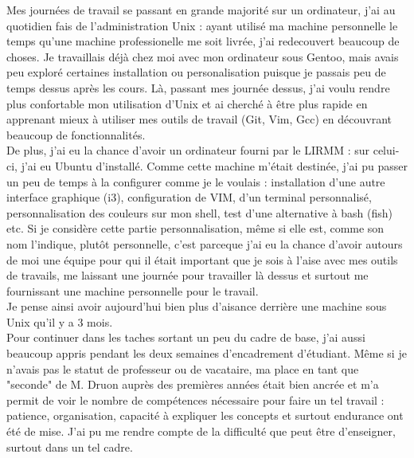 \documentclass[11pt,french,a4paper]{report}
\begin{document}
Mes journées de travail se passant en grande majorité sur un ordinateur, j'ai au quotidien fais de l'administration Unix : ayant utilisé ma machine
personnelle le temps qu'une machine professionelle me soit livrée, j'ai redecouvert beaucoup de choses. Je travaillais déjà chez moi avec mon ordinateur
sous Gentoo, mais avais peu exploré certaines installation ou personalisation puisque je passais peu de temps dessus après les cours. Là, passant
mes journée dessus, j'ai voulu rendre plus confortable mon utilisation d'Unix et ai cherché à être plus rapide en apprenant mieux à utiliser mes outils de travail
(Git, Vim, Gcc) en découvrant beaucoup de fonctionnalités. \\
De plus, j'ai eu la chance d'avoir un ordinateur fourni par le LIRMM : sur celui-ci, j'ai eu Ubuntu d'installé. Comme cette machine m'était destinée, 
j'ai pu passer un peu de temps à la configurer comme je le voulais : installation d'une autre interface graphique (i3), configuration de VIM, 
d'un terminal personnalisé, personnalisation des couleurs sur mon shell, test d'une alternative à bash (fish) etc.  Si je considère cette 
partie personnalisation, même si elle est, comme son nom l'indique, plutôt personnelle, c'est parceque j'ai eu la chance d'avoir autours de moi
une équipe pour qui il était important que je sois à l'aise avec mes outils de travails, me laissant une journée pour travailler là dessus et 
surtout me fournissant une machine personnelle pour le travail. \\ 
Je pense ainsi avoir aujourd'hui bien plus d'aisance derrière une machine sous Unix qu'il y a 3 mois. \\

Pour continuer dans les taches sortant un peu du cadre de base, j'ai aussi beaucoup appris pendant les deux semaines d'encadrement d'étudiant. Même
si je n'avais pas le statut de professeur ou de vacataire, ma place en tant que "seconde" de M. Druon auprès des premières années était bien ancrée 
et m'a permit de voir le nombre de compétences nécessaire pour faire un tel travail : patience, organisation, capacité à expliquer les concepts et surtout 
endurance ont été de mise. J'ai pu me rendre compte de la difficulté que peut être d'enseigner, surtout dans un tel cadre. \\
\end{document}
